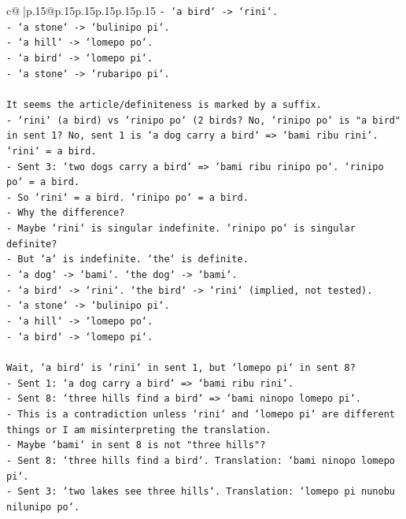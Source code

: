 \documentclass{article}
\begin{document}
{\begin{supertabular}{c@{$\;$}|p{.15\linewidth}@{}p{.15\linewidth}p{.15\linewidth}p{.15\linewidth}p{.15\linewidth}p{.15\linewidth}}
{{{\texttt{{-} `a bird` {-}> `rini`.} \\
\texttt{{-} `a stone` {-}> `bulinipo pi`.} \\
\texttt{{-} `a hill` {-}> `lomepo po`.} \\
\texttt{{-} `a bird` {-}> `lomepo pi`.} \\
\texttt{{-} `a stone` {-}> `rubaripo pi`.} \\
\\ 
\texttt{It seems the article/definiteness is marked by a suffix.} \\
\texttt{{-} `rini` (a bird) vs `rinipo po` (2 birds? No, `rinipo po` is "a bird" in sent 1? No, sent 1 is `a dog carry a bird` => `bami ribu rini`. `rini` = a bird.} \\
\texttt{{-} Sent 3: `two dogs carry a bird` => `bami ribu rinipo po`. `rinipo po` = a bird.} \\
\texttt{{-} So `rini` = a bird. `rinipo po` = a bird.} \\
\texttt{{-} Why the difference?} \\
\texttt{{-} Maybe `rini` is singular indefinite. `rinipo po` is singular definite?} \\
\texttt{{-} But `a` is indefinite. `the` is definite.} \\
\texttt{{-} `a dog` {-}> `bami`. `the dog` {-}> `bami`.} \\
\texttt{{-} `a bird` {-}> `rini`. `the bird` {-}> `rini` (implied, not tested).} \\
\texttt{{-} `a stone` {-}> `bulinipo pi`.} \\
\texttt{{-} `a hill` {-}> `lomepo po`.} \\
\texttt{{-} `a bird` {-}> `lomepo pi`.} \\
\\ 
\texttt{Wait, `a bird` is `rini` in sent 1, but `lomepo pi` in sent 8?} \\
\texttt{{-} Sent 1: `a dog carry a bird` => `bami ribu rini`.} \\
\texttt{{-} Sent 8: `three hills find a bird` => `bami ninopo lomepo pi`.} \\
\texttt{{-} This is a contradiction unless `rini` and `lomepo pi` are different things or I am misinterpreting the translation.} \\
\texttt{{-} Maybe `bami` in sent 8 is not "three hills"?} \\
\texttt{{-} Sent 8: `three hills find a bird`. Translation: `bami ninopo lomepo pi`.} \\
\texttt{{-} Sent 3: `two lakes see three hills`. Translation: `lomepo pi nunobu nilunipo po`.} \\
}}}
\end{supertabular}}
\end{document}
